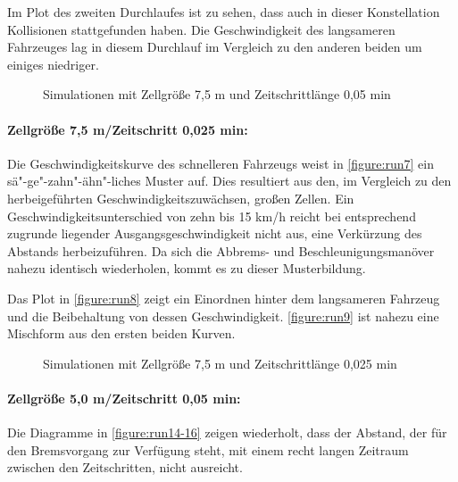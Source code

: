 Im Plot des zweiten Durchlaufes ist zu sehen, dass auch in dieser Konstellation Kollisionen stattgefunden haben.
Die Geschwindigkeit des langsameren Fahrzeuges lag in diesem Durchlauf im Vergleich zu den anderen beiden um einiges niedriger.
\begin{figure}[hptb]
  \centering 
   \qquad 
   \qquad 
  \caption{Simulationen mit Zellgröße 7,5 m und Zeitschrittlänge 0,05 min} 
  \label{figure:run4-6}
\end{figure}


\paragraph*{Zellgröße 7,5 m/Zeitschritt 0,025 min:}
Die Geschwindigkeitskurve des schnelleren Fahrzeugs weist in \cref{figure:run7} ein sä"-ge"-zahn"-ähn"-liches Muster auf.
Dies resultiert aus den, im Vergleich zu den herbeigeführten Geschwindigkeitszuwächsen, großen Zellen.
Ein Geschwindigkeitsunterschied von zehn bis 15 km/h reicht bei entsprechend zugrunde liegender Ausgangsgeschwindigkeit nicht aus, eine Verkürzung des Abstands herbeizuführen.
Da sich die Abbrems- und Beschleunigungsmanöver nahezu identisch wiederholen, kommt es zu dieser Musterbildung.

Das Plot in \cref{figure:run8} zeigt ein Einordnen hinter dem langsameren Fahrzeug und die Beibehaltung von dessen Geschwindigkeit.
\cref{figure:run9} ist nahezu eine Mischform aus den ersten beiden Kurven.
\begin{figure}[hptb]
  \centering 
   \qquad 
   \qquad 
  \caption{Simulationen mit Zellgröße 7,5 m und Zeitschrittlänge 0,025 min} 
  \label{figure:run7-9}
\end{figure}


\paragraph*{Zellgröße 5,0 m/Zeitschritt 0,05 min:}
Die Diagramme in \cref{figure:run14-16} zeigen wiederholt, dass der Abstand, der für den Bremsvorgang zur Verfügung steht, mit einem recht langen Zeitraum zwischen den Zeitschritten, nicht ausreicht.


